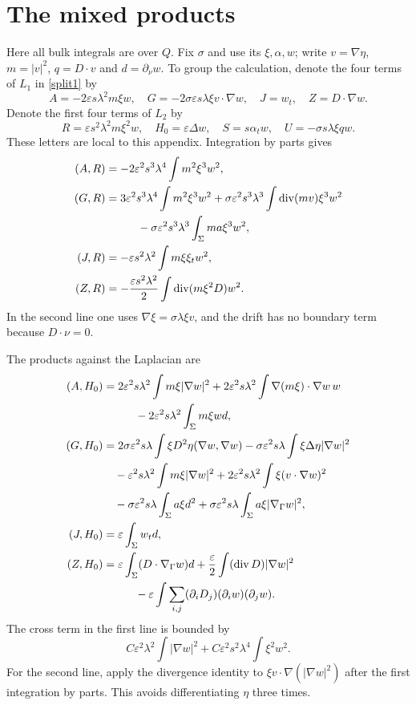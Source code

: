 \documentclass[11pt]{article}
\theoremstyle{remark}
\newcommand{\eps}{\varepsilon}
\newcommand{\divg}{\operatorname{div}}
\begin{document}
\appendix
\section{The mixed products}\label{app:products}

Here all bulk integrals are over $Q$. Fix $\sigma$ and use its $\xi,\alpha,w$;
write $v=\nabla\eta$, $m=|v|^2$, $q=D\cdot v$ and $d=\partial_\nu w$.
To group the calculation, denote the four terms of $L_1$ in
\eqref{split1} by
\[
 A=-2\eps s\lambda^2m\xi w,\quad
 G=-2\sigma\eps s\lambda\xi v\cdot\nabla w,\quad
 J=w_t,\quad Z=D\cdot\nabla w.
\]
Denote the first four terms of $L_2$ by
\[
 R=\eps s^2\lambda^2m\xi^2w,\quad H_0=\eps\Delta w,
 \quad S=s\alpha_tw,\quad U=-\sigma s\lambda\xi q w.
\]
These letters are local to this appendix. Integration by parts gives
\begin{align}
 (A,R)&=-2\eps^2s^3\lambda^4\int m^2\xi^3w^2,\notag\\
 (G,R)&=3\eps^2s^3\lambda^4\int m^2\xi^3w^2
       +\sigma\eps^2s^3\lambda^3\int\divg(mv)\xi^3w^2\notag\\
       &\hspace{1cm}-\sigma\eps^2s^3\lambda^3\int_\Sigma ma\xi^3w^2,\notag\\
 (J,R)&=-\eps s^2\lambda^2\int m\xi\xi_t w^2,\notag\\
 (Z,R)&=-\frac{\eps s^2\lambda^2}{2}\int\divg(m\xi^2D)w^2.
 \label{products-R}
\end{align}
In the second line one uses $\nabla\xi=\sigma\lambda\xi v$, and the drift
has no boundary term because $D\cdot\nu=0$.

The products against the Laplacian are
\begin{align}
 (A,H_0)&=2\eps^2s\lambda^2\int m\xi|\nabla w|^2
       +2\eps^2s\lambda^2\int\nabla(m\xi)\cdot\nabla w\,w\notag\\
       &\hspace{1cm}-2\eps^2s\lambda^2\int_\Sigma m\xi wd,\notag\\
 (G,H_0)&=2\sigma\eps^2s\lambda\int\xi D^2\eta(\nabla w,\nabla w)
       -\sigma\eps^2s\lambda\int\xi\Delta\eta|\nabla w|^2\notag\\
       &\quad-\eps^2s\lambda^2\int m\xi|\nabla w|^2
       +2\eps^2s\lambda^2\int\xi(v\cdot\nabla w)^2\notag\\
       &\quad-\sigma\eps^2s\lambda\int_\Sigma a\xi d^2
       +\sigma\eps^2s\lambda\int_\Sigma a\xi|\nabla_\Gamma w|^2,\notag\\
 (J,H_0)&=\eps\int_\Sigma w_t d,\notag\\
 (Z,H_0)&=\eps\int_\Sigma(D\cdot\nabla_\Gamma w)d
       +\frac\eps2\int(\divg D)|\nabla w|^2\notag\\
       &\hspace{1cm}-\eps\int\sum_{i,j}(\partial_iD_j)(\partial_iw)(\partial_jw).
 \label{products-H}
\end{align}
The cross term in the first line is bounded by
\[
 C\eps^2\lambda^2\int|\nabla w|^2+
 C\eps^2s^2\lambda^4\int\xi^2w^2.
\]
For the second line, apply the divergence identity to
$\xi v\cdot\nabla(|\nabla w|^2)$ after the first integration by parts.
This avoids differentiating $\eta$ three times.
\end{document}
